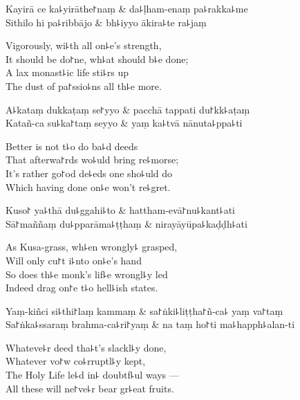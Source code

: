 \begin{twochants}
  Kayirā ce ka꜕yirāthe꜓naṃ & da꜕ḷham-enaṃ pa꜕rakka꜕me \\
  Sithilo hi pa꜕ribbājo & bh꜕iyyo ākira꜕te ra꜕jaṃ \\
\end{twochants}

\begin{english}
  Vigorously, wi꜕th all on꜕e's strength,\\
  It should be do꜓ne, wh꜕at should b꜕e done;\\
  A lax monast꜕ic life sti꜕rs up\\
  The dust of pa꜓ssio꜕ns all th꜕e more.
\end{english}

\begin{twochants}
  A꜕kataṃ dukkaṭaṃ se꜓yyo & pacchā tappati du꜓kk꜕aṭaṃ \\
  Katañ-ca su꜕ka꜓taṃ seyyo & yaṃ ka꜕tvā nānuta꜕ppa꜕ti \\
\end{twochants}

\begin{english}
  Better is not t꜕o do ba꜕d deeds\\
  That afterwa꜓rds wo꜕uld bring re꜕morse;\\
  It's rather go꜓od de꜕eds one sho꜕uld do\\
  Which having done on꜕e won't re꜕gret.
\end{english}

\begin{twochants}
  Kuso꜓ ya꜕thā du꜕ggahi꜕to & hattham-evā꜓nu꜕kant꜕ati \\
  Sā꜓maññaṃ du꜕pparāma꜕ṭṭhaṃ & nirayāyūpa꜕kaḍḍh꜕ati \\
\end{twochants}

\begin{english}
  As Kusa-grass, wh꜕en wrongly꜕ grasped,\\
  Will only cu꜓t i꜕nto on꜕e's hand\\
  So does th꜕e monk's lif꜕e wrongl꜕y led\\
  Indeed drag on꜓e t꜕o hell꜕ish states.
\end{english}

\begin{twochants}
  Yaṃ-kiñci si꜕thi꜓laṃ kammaṃ & sa꜓ṅki꜕liṭṭha꜓ñ-ca꜕ yaṃ va꜓taṃ \\
  Sa꜓ṅka꜕ssaraṃ brahma-ca꜕ri꜓yaṃ & na taṃ ho꜓ti ma꜕happh꜕alan-ti \\
\end{twochants}

\begin{english}
  Whateve꜕r deed tha꜕t's slackl꜕y done,\\
  Whatever vo꜓w co꜕rruptl꜕y kept,\\
  The Holy Life le꜕d in꜕ doubtf꜕ul ways ---\\
  All these will ne꜓ve꜕r bear gr꜕eat fruits.
\end{english}



